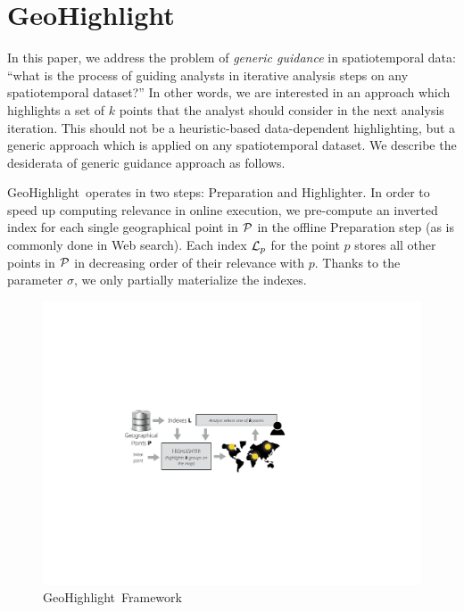 \documentclass[conference]{IEEEtran}
\newcommand{\sys}{{\sc GeoHighlight}}
\newcommand{\framework}{{\sc GeoHighlight}}
\begin{document}
\vspace{-5pt}

\section{\sys}
In this paper, we address the problem of {\em generic guidance} in spatiotemporal data: ``what is the process of guiding analysts in iterative analysis steps on any spatiotemporal dataset?'' In other words, we are interested in an approach which highlights a set of $k$ points that the analyst should consider in the next analysis iteration. This should not be a heuristic-based data-dependent highlighting, but a generic approach which is applied on any spatiotemporal dataset. We describe the desiderata of generic guidance approach as follows.

\framework\ operates in two steps: {\sc Preparation} and {\sc Highlighter}. In order to speed up computing relevance in online execution, we pre-compute an inverted index for each single geographical point in ${\cal P}$ in the offline {\sc Preparation} step (as is commonly done in Web search). Each index ${\cal L}_p$ for the point $p$ stores all other points in ${\cal P}$ in decreasing order of their relevance with $p$. Thanks to the parameter $\sigma$, we only partially materialize the indexes.


 \begin{figure}[t]
   \centering
   \includegraphics[width=\columnwidth]{figs/framework}

 \caption{\framework\ Framework}
 \label{fig:frame}
 \vspace{-10pt}
 \end{figure}
\end{document}
